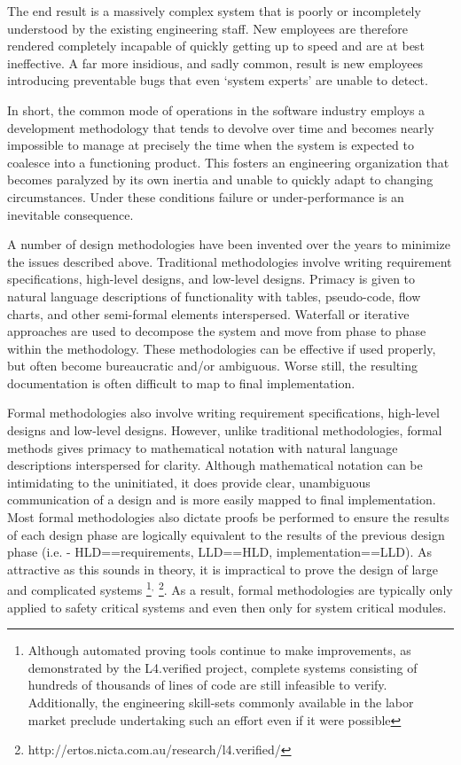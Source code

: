 \documentclass[letterpaper,10pt,draft]{book}
\begin{document}
The end result is a massively complex system that is poorly or incompletely understood
by the existing engineering staff.  New employees are therefore rendered completely
incapable of quickly getting up to speed and are at best ineffective.  A far more
insidious, and sadly common, result is new employees introducing preventable bugs
that even `system experts' are unable to detect.

In short, the common mode of operations in the software industry employs a development
methodology that tends to devolve over time and becomes nearly impossible to manage
at precisely the time when the system is expected to coalesce into a functioning
product.  This fosters an engineering organization that becomes paralyzed by its
own inertia and unable to quickly adapt to changing circumstances.  Under these
conditions failure or under-performance is an inevitable consequence.

A number of design methodologies have been invented over the years to minimize the
issues described above.  Traditional methodologies involve writing requirement specifications,
high-level designs, and low-level designs.  Primacy is given to natural language
descriptions of functionality with tables, pseudo-code, flow charts, and other semi-formal
elements interspersed.  Waterfall or iterative approaches are used to decompose
the system and move from phase to phase within the methodology.  These methodologies
can be effective if used properly, but often become bureaucratic and/or ambiguous.
Worse still, the resulting documentation is often difficult to map to final implementation.

Formal methodologies also involve writing requirement specifications, high-level
designs and low-level designs.  However, unlike traditional methodologies, formal
methods gives primacy to mathematical notation with natural language descriptions
interspersed for clarity.  Although mathematical notation can be intimidating to
the uninitiated, it does provide clear, unambiguous communication of a design and
is more easily mapped to final implementation.  Most formal methodologies also dictate
proofs be performed to ensure the results of each design phase are logically equivalent
to the results of the previous design phase (i.e. - HLD==requirements, LLD==HLD,
implementation==LLD).  As attractive as this sounds in theory, it is impractical
to prove the design of large and complicated systems \footnote{Although automated
proving tools continue to make improvements, as demonstrated by the L4.verified
project, complete systems consisting of hundreds of thousands of lines of code are
still infeasible to verify.  Additionally, the engineering skill-sets commonly available
in the labor market preclude undertaking such an effort even if it were possible}$^{,}$
\footnote{http://ertos.nicta.com.au/research/l4.verified/}.  As a result, formal
methodologies are typically only applied to safety critical systems and even then
only for system critical modules.
\end{document}
